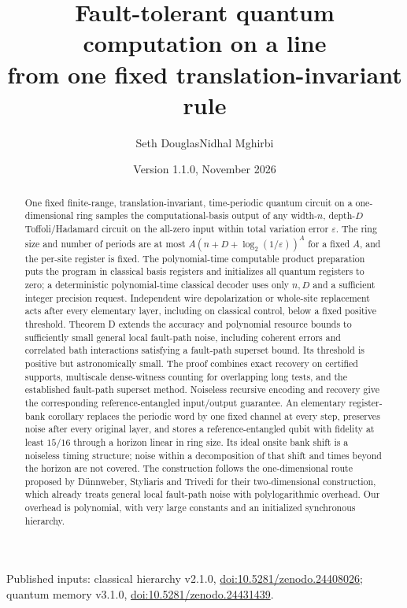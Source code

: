 \documentclass[11pt,a4paper]{article}
\title{Fault-tolerant quantum computation on a line\\from one fixed translation-invariant rule\\[.65em]\resizebox{\textwidth}{!}{\normalfont Claude Opus 5.5, GPT-6.1 Sol, GPT-6.2 Sol and GPT-6.2 Astra assisted with this work; the authors take responsibility for every claim.}}
\author{Seth Douglas\qquad Nidhal Mghirbi}
\date{Version 1.1.0, November 2026}
\theoremstyle{definition}
\theoremstyle{remark}
\numberwithin{equation}{section}
\begin{document}
\maketitle
\begin{abstract}
One fixed finite-range, translation-invariant, time-periodic quantum circuit on a one-dimensional ring samples the computational-basis output of any width-$n$, depth-$D$ Toffoli/Hadamard circuit on the all-zero input within total variation error $\varepsilon$. The ring size and number of periods are at most $A(n+D+\log_2(1/\varepsilon))^A$ for a fixed $A$, and the per-site register is fixed. The polynomial-time computable product preparation puts the program in classical basis registers and initializes all quantum registers to zero; a deterministic polynomial-time classical decoder uses only $n,D$ and a sufficient integer precision request. Independent wire depolarization or whole-site replacement acts after every elementary layer, including on classical control, below a fixed positive threshold. Theorem D extends the accuracy and polynomial resource bounds to sufficiently small general local fault-path noise, including coherent errors and correlated bath interactions satisfying a fault-path superset bound. Its threshold is positive but astronomically small. The proof combines exact recovery on certified supports, multiscale dense-witness counting for overlapping long tests, and the established fault-path superset method. Noiseless recursive encoding and recovery give the corresponding reference-entangled input/output guarantee. An elementary register-bank corollary replaces the periodic word by one fixed channel at every step, preserves noise after every original layer, and stores a reference-entangled qubit with fidelity at least $15/16$ through a horizon linear in ring size. Its ideal onsite bank shift is a noiseless timing structure; noise within a decomposition of that shift and times beyond the horizon are not covered. The construction follows the one-dimensional route proposed by D\"unnweber, Styliaris and Trivedi for their two-dimensional construction, which already treats general local fault-path noise with polylogarithmic overhead. Our overhead is polynomial, with very large constants and an initialized synchronous hierarchy.
\end{abstract}
\begin{center}\footnotesize Published inputs: classical hierarchy v2.1.0, \href{https://doi.org/10.5281/zenodo.24408026}{doi:10.5281/zenodo.24408026}; quantum memory v3.1.0, \href{https://doi.org/10.5281/zenodo.24431439}{doi:10.5281/zenodo.24431439}.\end{center}
\tableofcontents













\end{document}
